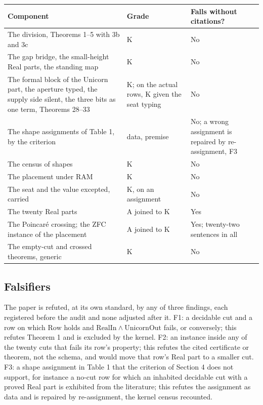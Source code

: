 \documentclass[10pt]{article}
\begin{document}
\begin{table}[!h]
\centering\scriptsize
\renewcommand{\arraystretch}{1.15}
\begin{tabularx}{\columnwidth}{@{}L P{0.19\columnwidth} P{0.22\columnwidth}@{}}
\toprule
\textbf{Component} & \textbf{Grade} & \textbf{Falls without citations?} \\
\midrule
The division, Theorems 1--5 with 3b and 3c & K & No \\
The gap bridge, the small-height Real parts, the standing map & K & No \\
The formal block of the Unicorn part, the aperture typed, the supply side silent, the three bits as one term, Theorems 28--33 & K; on the actual rows, K given the seat typing & No \\
The shape assignments of Table 1, by the criterion & data, premise & No; a wrong assignment is repaired by re-assignment, F3 \\
The census of shapes & K & No \\
The placement under RAM & K & No \\
The seat and the value excepted, carried & K, on an assignment & No \\
The twenty Real parts & A joined to K & Yes \\
The Poincaré crossing; the ZFC instance of the placement & A joined to K & Yes; twenty-two sentences in all \\
The empty-cut and crossed theorems, generic & K & No \\
\bottomrule
\end{tabularx}
\end{table}

\hypertarget{falsifiers}{%
\subsection{Falsifiers}\label{falsifiers}}

The paper is refuted, at its own standard, by any of three findings,
each registered before the audit and none adjusted after it. F1: a
decidable cut and a row on which \(\mathrm{Row}\) holds and
\(\mathrm{RealIn} \wedge \mathrm{UnicornOut}\) fails, or conversely;
this refutes Theorem 1 and is excluded by the kernel. F2: an instance
inside any of the twenty cuts that fails its row's property; this
refutes the cited certificate or theorem, not the schema, and would move
that row's Real part to a smaller cut. F3: a shape assignment in Table 1
that the criterion of Section 4 does not support, for instance a no-cut
row for which an inhabited decidable cut with a proved Real part is
exhibited from the literature; this refutes the assignment as data and
is repaired by re-assignment, the kernel census recounted.
\end{document}
